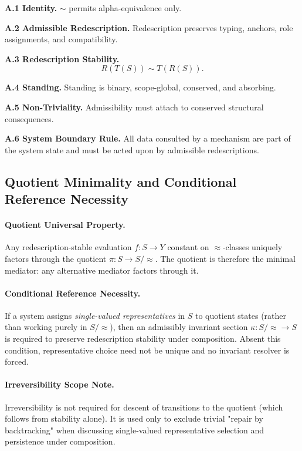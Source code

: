 \documentclass[11pt]{article}
\theoremstyle{definition}
\begin{document}
\textbf{A.1 Identity.} $\sim$ permits alpha-equivalence only.

\textbf{A.2 Admissible Redescription.}
Redescription preserves typing, anchors, role assignments, and compatibility.

\textbf{A.3 Redescription Stability.}
\[
R(T(S)) \sim T(R(S)).
\]

\textbf{A.4 Standing.}
Standing is binary, scope-global, conserved, and absorbing.

\textbf{A.5 Non-Triviality.}
Admissibility must attach to conserved structural consequences.

\textbf{A.6 System Boundary Rule.}
All data consulted by a mechanism are part of the system state and must be acted upon by admissible redescriptions.


\subsection*{Quotient Minimality and Conditional Reference Necessity}
\paragraph{Quotient Universal Property.}
Any redescription-stable evaluation $f:S\to Y$ constant on $\approx$-classes uniquely factors
through the quotient $\pi:S\to S/\approx$. The quotient is therefore the minimal mediator:
any alternative mediator factors through it.

\paragraph{Conditional Reference Necessity.}
If a system assigns \emph{single-valued representatives} in $S$ to quotient states (rather than
working purely in $S/\approx$), then an admissibly invariant section $\kappa:S/\approx\to S$
is required to preserve redescription stability under composition. Absent this condition,
representative choice need not be unique and no invariant resolver is forced.


\paragraph{Irreversibility Scope Note.}
Irreversibility is not required for descent of transitions to the quotient (which follows from stability alone).
It is used only to exclude trivial "repair by backtracking" when discussing single-valued representative selection
and persistence under composition.
\end{document}
